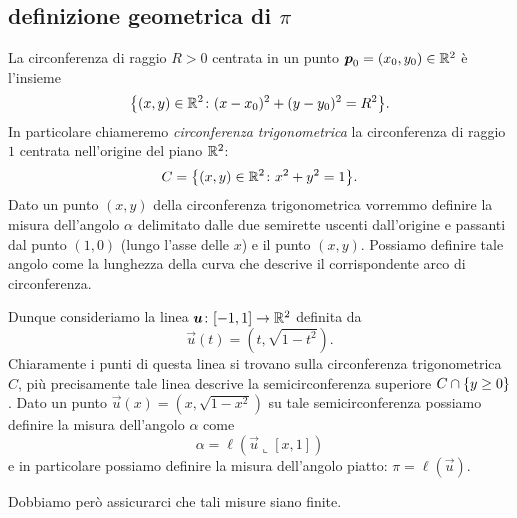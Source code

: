\subsection{definizione geometrica di $\pi$}

La circonferenza di raggio $R>0$ centrata in un punto $\boldsymbol p_0 = (x_0,y_0)\in {\mathbb R}^2$ 
è l'insieme 
\[
 {\left\{ (x,y) \in {\mathbb R}^2\colon (x-x_0)^2 + (y-y_0)^2 = R^2 \right\}}.  
\]
In particolare chiameremo \emph{circonferenza trigonometrica} la circonferenza 
di raggio $1$ centrata nell'origine del piano ${\mathbb R}^2$:
\[
 C = {\left\{ (x,y)\in {\mathbb R}^2 \colon x^2 + y^2 = 1 \right\}}.  
\]
Dato un punto $(x,y)$ della circonferenza trigonometrica vorremmo definire 
la misura dell'angolo $\alpha$ delimitato dalle due semirette uscenti dall'origine 
e passanti dal punto $(1,0)$ (lungo l'asse delle $x$) e il punto $(x,y)$.
Possiamo definire tale angolo come la lunghezza della curva che descrive il corrispondente 
arco di circonferenza.

Dunque consideriamo la linea $\boldsymbol u\colon [-1,1]\to {\mathbb R}^2$ definita da
\[
  \vec u(t) = (t,\sqrt{1-t^2}).
\]
Chiaramente i punti di questa linea si trovano sulla circonferenza trigonometrica $C$, 
più precisamente tale linea descrive la semicirconferenza superiore $C\cap{\left\{ y\ge 0 \right\}}$.
Dato un punto $\vec u(x) = (x,\sqrt{1-x^2})$ su tale semicirconferenza possiamo definire la 
misura dell'angolo $\alpha$ come 
\[
  \alpha = \ell(\vec u\llcorner [x,1])
\]
e in particolare possiamo definire la misura dell'angolo piatto: 
$\pi = \ell(\vec u)$.
\mymargin{$\pi$}%
%

Dobbiamo però assicurarci che tali misure siano finite.

